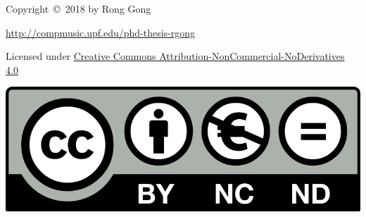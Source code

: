 \thispagestyle{empty}

\noindent Copyright~\copyright~2018 by Rong Gong

\vspace{2.5em}
\noindent \url{http://compmusic.upf.edu/phd-thesis-rgong}

\vspace{2em}
\noindent Licensed under \href{http://creativecommons.org/licenses/by-nc-nd/4.0/}{Creative Commons Attribution-NonCommercial-NoDerivatives 4.0}

\vspace{1em}
\noindent \href{http://creativecommons.org/licenses/by-nc-nd/4.0/}{\includegraphics[scale=0.12]{figs/creative-commons.png}}

\vfill

